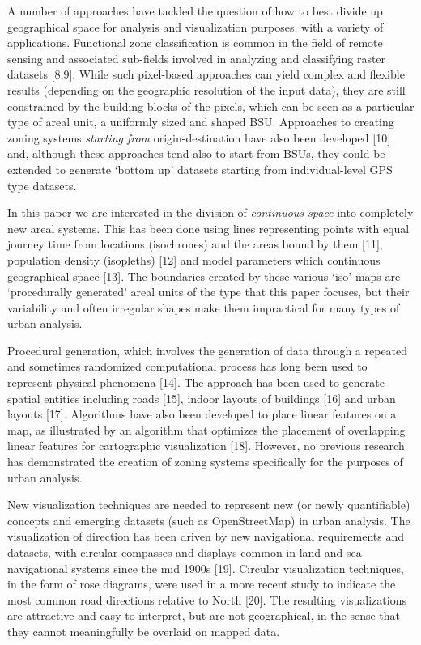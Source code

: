 \documentclass{josis}
\begin{document}
A number of approaches have tackled the question of how to best divide up geographical space for analysis and visualization purposes, with a variety of applications.
Functional zone classification is common in the field of remote sensing and associated sub-fields involved in analyzing and classifying raster datasets {[}8,9{]}.
While such pixel-based approaches can yield complex and flexible results (depending on the geographic resolution of the input data), they are still constrained by the building blocks of the pixels, which can be seen as a particular type of areal unit, a uniformly sized and shaped BSU.
Approaches to creating zoning systems \emph{starting from} origin-destination have also been developed {[}10{]} and, although these approaches tend also to start from BSUs, they could be extended to generate `bottom up' datasets starting from individual-level GPS type datasets.

In this paper we are interested in the division of \emph{continuous space} into completely new areal systems.
This has been done using lines representing points with equal journey time from locations (isochrones) and the areas bound by them {[}11{]}, population density (isopleths) {[}12{]} and model parameters which continuous geographical space {[}13{]}.
The boundaries created by these various `iso' maps are `procedurally generated' areal units of the type that this paper focuses, but their variability and often irregular shapes make them impractical for many types of urban analysis.

Procedural generation, which involves the generation of data through a repeated and sometimes randomized computational process has long been used to represent physical phenomena {[}14{]}. The approach has been used to generate spatial entities including roads {[}15{]}, indoor layouts of buildings {[}16{]} and urban layouts {[}17{]}. Algorithms have also been developed to place linear features on a map, as illustrated by an algorithm that optimizes the placement of overlapping linear features for cartographic visualization {[}18{]}.
However, no previous research has demonstrated the creation of zoning systems specifically for the purposes of urban analysis.

New visualization techniques are needed to represent new (or newly quantifiable) concepts and emerging datasets (such as OpenStreetMap) in urban analysis.
The visualization of direction has been driven by new navigational requirements and datasets, with circular compasses and displays common in land and sea navigational systems since the mid 1900s {[}19{]}. Circular visualization techniques, in the form of rose diagrams, were used in a more recent study to indicate the most common road directions relative to North {[}20{]}. The resulting visualizations are attractive and easy to interpret, but are not geographical, in the sense that they cannot meaningfully be overlaid on mapped data.
\end{document}
